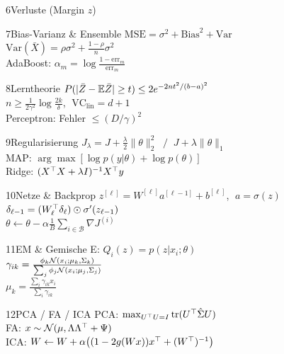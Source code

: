 \begin{hngrid}
\begin{hnp}[raster multicolumn=2,acc=hnnavy]{6}{Verluste (Margin $z$)}
\end{hnp}
%
\begin{hnp}[raster multicolumn=2,acc=hnorange]{7}{Bias-Varianz \& Ensemble}
$\mathrm{MSE}=\sigma^2+\mathrm{Bias}^2+\mathrm{Var}$\\[2pt]
$\mathrm{Var}(\bar X)=\rho\sigma^2+\frac{1-\rho}{n}\sigma^2$\\[2pt]
AdaBoost: $\alpha_m=\log\frac{1-\mathrm{err}_m}{\mathrm{err}_m}$
\end{hnp}
%
\begin{hnp}[raster multicolumn=2,acc=hnpurple]{8}{Lerntheorie}
$P(|\bar Z-\mathbb{E}\bar Z|\ge t)\le2e^{-2nt^2/(b-a)^2}$\\[2pt]
$n\ge\frac{1}{2\gamma^2}\log\frac{2k}{\delta}$, $\;\mathrm{VC}_{\mathrm{lin}}=d+1$\\[2pt]
Perceptron: Fehler $\le(D/\gamma)^2$
\end{hnp}
%
\begin{hnp}[raster multicolumn=2,acc=hnteal]{9}{Regularisierung}
$J_\lambda=J+\frac\lambda2\|\theta\|_2^2\;\;/\;\;J+\lambda\|\theta\|_1$\\[2pt]
MAP: $\arg\max[\log p(y|\theta)+\log p(\theta)]$\\[2pt]
Ridge: $(X^{\top} X+\lambda I)^{-1}X^{\top} y$
\end{hnp}
%
\begin{hnp}[raster multicolumn=2,acc=hngreen]{10}{Netze \& Backprop}
$z^{[\ell]}=W^{[\ell]}a^{[\ell-1]}+b^{[\ell]}$, $\;a=\sigma(z)$\\[2pt]
$\delta_{\ell-1}=(W_\ell^{\top}\delta_\ell)\odot\sigma'(z_{\ell-1})$\\[2pt]
$\theta\leftarrow\theta-\alpha\frac1B\sum_{i\in\mathcal B}\nabla J^{(i)}$
\end{hnp}
%
\begin{hnp}[raster multicolumn=2,acc=hnrose]{11}{EM \& Gemische}
E: $Q_i(z)=p(z|x_i;\theta)$\\[2pt]
$\gamma_{ik}=\frac{\phi_k\mathcal{N}(x_i;\mu_k,\Sigma_k)}{\sum_j\phi_j\mathcal{N}(x_i;\mu_j,\Sigma_j)}$\\[2pt]
$\mu_k=\frac{\sum_i\gamma_{ik}x_i}{\sum_i\gamma_{ik}}$
\end{hnp}
%
\begin{hnp}[raster multicolumn=2,acc=hnnavy]{12}{PCA / FA / ICA}
PCA: $\max_{U^{\top} U=I}\mathrm{tr}(U^{\top}\hat\Sigma U)$\\[2pt]
FA: $x\sim\mathcal{N}(\mu,\Lambda\Lambda^{\top}+\Psi)$\\[2pt]
ICA: $W\leftarrow W+\alpha\bigl((1-2g(Wx))x^{\top}+(W^{\top})^{-1}\bigr)$
\end{hnp}

\end{hngrid}
